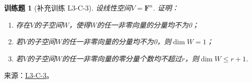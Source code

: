 \documentclass[12pt,fontset=fandol]{ctexart}
\newtheorem{exercise}{训练题}[section]
\begin{document}
\begin{exercise}[补充训练 L3-C-3]\label{prob:L3-C-3}
设线性空间$V=\mathbf{F}^n$. 证明：
        \begin{enumerate}
            \item 存在$V$的子空间$W$，使得$W$的任一非零向量的分量均不为0；

            \item 若$V$的子空间$W$的任一非零向量的分量均不为0，则$\dim W=1$；

            \item 若$V$的子空间$W$的任一非零向量的零分量个数均不超过$r$，则$\dim W \leqslant r+1$.
        \end{enumerate}
\end{exercise}
\noindent 来源：\href{https://github.com/yhwu-is/Linear-Algebra-Left-Undone/blob/new/%E8%AE%B2%E4%B9%89/%E4%B8%93%E9%A2%98/3%20%E6%9C%89%E9%99%90%E7%BB%B4%E7%BA%BF%E6%80%A7%E7%A9%BA%E9%97%B4.tex}{L3-C-3}。
\end{document}
